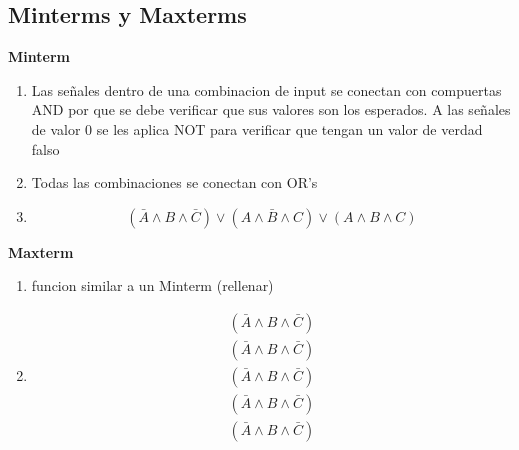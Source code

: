 \documentclass{article}
\begin{document}
        \subsection{Minterms y Maxterms}
        \textbf{Minterm}
        \begin{enumerate}
            \item Las señales dentro de una combinacion de input se conectan con compuertas AND
            por que se debe verificar que sus valores son los esperados.
            A las señales de valor 0 se les aplica NOT para verificar que tengan un valor de verdad falso
            \item Todas las combinaciones se conectan con OR's 
            \item \begin{equation}
                ( \bar{A} \wedge B \wedge \bar{C}) \vee 
                ( A \wedge \bar{B} \wedge C) \vee  
                ( A \wedge B \wedge C)
            \end{equation}  
        \end{enumerate}
        \textbf{Maxterm}
        \begin{enumerate}
            \item funcion similar a un Minterm (rellenar)
            \item \begin{equation}
                \begin{aligned}
                    ( \bar{A} \wedge B \wedge \bar{C}) \\
                    ( \bar{A} \wedge B \wedge \bar{C}) \\
                    ( \bar{A} \wedge B \wedge \bar{C}) \\ 
                    ( \bar{A} \wedge B \wedge \bar{C}) \\
                    ( \bar{A} \wedge B \wedge \bar{C}) 
                \end{aligned}
            \end{equation}
        \end{enumerate}
        \newpage
\end{document}
